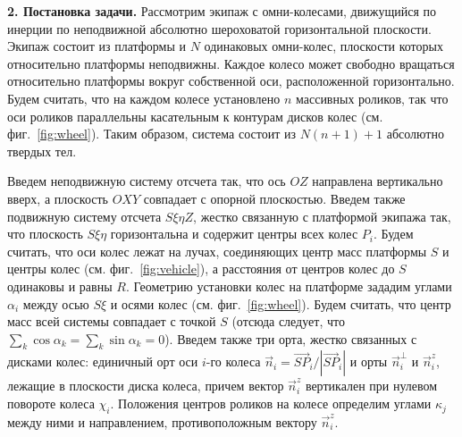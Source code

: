 {\bf 2. Постановка задачи.}
Рассмотрим экипаж с омни-колесами, движущийся по инерции по неподвижной абсолютно шероховатой горизонтальной плоскости. Экипаж состоит из платформы и $N$ одинаковых омни-колес, плоскости которых относительно платформы неподвижны. Каждое колесо может свободно вращаться относительно платформы вокруг собственной оси, расположенной горизонтально. Будем считать, что на каждом колесе установлено $n$ массивных роликов, так что оси роликов параллельны касательным к контурам дисков колес (см. фиг.~\ref{fig:wheel}). Таким образом, система состоит из $N(n+1) + 1$ абсолютно твердых тел. 



Введем неподвижную систему отсчета так, что ось $OZ$ направлена вертикально вверх, а плоскость $OXY$ совпадает с опорной плоскостью.
Введем также подвижную систему отсчета $S\xi\eta Z$, жестко связанную с платформой экипажа так, что плоскость $S\xi\eta$ горизонтальна и содержит центры всех колес $P_i$. Будем считать, что оси колес лежат на лучах, соединяющих центр масс платформы $S$ и центры колес (см. фиг.~\ref{fig:vehicle}), а расстояния от центров колес до $S$ одинаковы и равны $R$. Геометрию установки колес на платформе зададим углами $\alpha_i$ между осью $S\xi$ и осями колес 
(см. фиг.~\ref{fig:wheel}). Будем считать, что центр масс всей системы совпадает с точкой $S$ (отсюда следует, что $\sum\limits_{k} \cos\alpha_k = \sum\limits_{k}\sin\alpha_k = 0$). Введем также три орта, жестко связанных с дисками колес: единичный орт оси $i$-го колеса $\vec{n}_i = \vec{SP}_i/|\vec{SP}_i|$ и орты $\vec{n}_i^\perp$ и $\vec{n}_i^z$, лежащие в плоскости диска колеса, причем вектор $\vec{n}_i^z$ вертикален при нулевом повороте колеса $\chi_i$. Положения центров роликов на колесе определим углами $\kappa_j$ между ними и направлением, противоположным вектору $\vec{n}_i^z$. 

